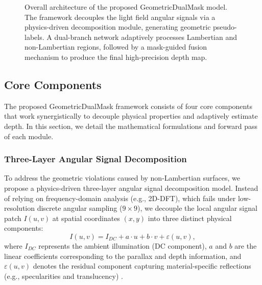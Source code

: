 \begin{figure}[!t]
\caption{Overall architecture of the proposed GeometricDualMask model. The framework decouples the light field angular signals via a physics-driven decomposition module, generating geometric pseudo-labels. A dual-branch network adaptively processes Lambertian and non-Lambertian regions, followed by a mask-guided fusion mechanism to produce the final high-precision depth map.}
\label{fig:architecture}
\end{figure}

\subsection{Core Components}

The proposed GeometricDualMask framework consists of four core components that work synergistically to decouple physical properties and adaptively estimate depth. In this section, we detail the mathematical formulations and forward pass of each module.

\subsubsection{Three-Layer Angular Signal Decomposition}
To address the geometric violations caused by non-Lambertian surfaces, we propose a physics-driven three-layer angular signal decomposition model. Instead of relying on frequency-domain analysis (e.g., 2D-DFT), which fails under low-resolution discrete angular sampling ($9 \times 9$), we decouple the local angular signal patch $I(u,v)$ at spatial coordinates $(x,y)$ into three distinct physical components:
\begin{equation}
    I(u,v) = I_{DC} + a \cdot u + b \cdot v + \varepsilon(u,v),
    \label{eq:ch3_1}
\end{equation}
where $I_{DC}$ represents the ambient illumination (DC component), $a$ and $b$ are the linear coefficients corresponding to the parallax and depth information, and $\varepsilon(u,v)$ denotes the residual component capturing material-specific reflections (e.g., specularities and translucency) \cite{smith2023lightfield}. 

